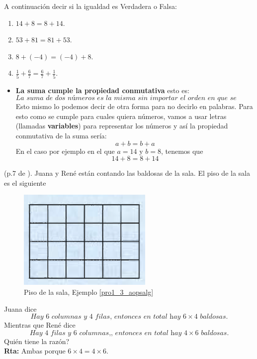 \begin{ejemplo}
		A continuación decir si la igualdad es Verdadera o Falsa:
		\begin{multicols}{2}
		\begin{enumerate}[label=\Alph*)]
				\item $14+8=8+14$.
				\item $53+81=81+53$.
				\item $8+(-4)=(-4)+8$.
				\item $\frac{1}{5} + \frac{6}{7} = \frac{6}{7} + \frac{1}{5}$.
		\end{enumerate}
		\end{multicols}
\end{ejemplo}

\begin{tcolorbox}[colback=red!5!white,colframe=red!75!black]
	\begin{itemize}
		\item \textbf{La suma cumple la propiedad conmutativa} esto es:
		\[
		\textit{La suma de dos números es la misma sin importar el orden en que se sume}
		\]
		Esto mismo lo podemos decir de otra forma para no decirlo en palabras. Para esto como se cumple para cuales quiera números, vamos a usar letras (llamadas \textbf{variables}) para representar los números y así la propiedad conmutativa de la suma sería:
		\[
		a+b=b+a
		\]
		En el caso por ejemplo en el que $a=14$ y $b=8$, tenemos que 
		\[
		14+8=8+14
		\]
	\end{itemize}
\end{tcolorbox}


\begin{ejemplo}\label{pro1_3_aopsalg} (p.7 de \cite{Aops_algebra}). Juana y René están contando las baldosas de la sala. El piso de la sala es el siguiente
		\begin{figure}[H]
			\centering
			\includegraphics[width=0.5\linewidth]{Algebra/imgs/AopsALG_pag7_p1_3}
			\caption{Piso de la sala, Ejemplo \ref{pro1_3_aopsalg}}
			\label{AopsALG_pag7_p1_3}
		\end{figure}
Juana dice 
\[
		\textit{Hay 6 columnas y 4 filas, entonces en total hay $6\times 4$ baldosas}.
\]
Mientras que René dice
\[
\textit{Hay 4 filas y 6 columnas,, entonces en total hay $4\times 6$ baldosas}.
\]
Quién tiene la razón?\\
\textbf{Rta: }Ambas porque $6\times 4=4\times 6$.
\end{ejemplo}

